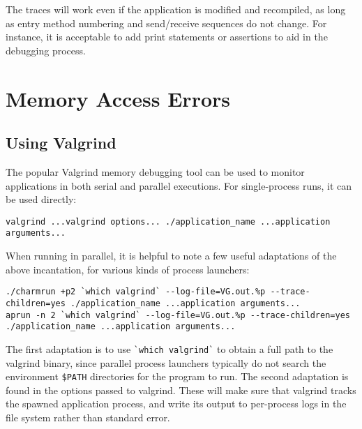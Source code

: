 The traces will work even if the application is modified and
recompiled, as long as entry method numbering and send/receive
sequences do not change. For instance, it is acceptable to add print
statements or assertions to aid in the debugging process.


\section{Memory Access Errors}


\subsection{Using Valgrind}

The popular Valgrind memory debugging tool can be used to
monitor \charm applications in both serial and parallel
executions. For single-process runs, it can be used directly:
\begin{verbatim}
valgrind ...valgrind options... ./application_name ...application arguments...
\end{verbatim}

When running in parallel, it is helpful to note a few useful
adaptations of the above incantation, for various kinds of process launchers:
\begin{verbatim}
./charmrun +p2 `which valgrind` --log-file=VG.out.%p --trace-children=yes ./application_name ...application arguments...
aprun -n 2 `which valgrind` --log-file=VG.out.%p --trace-children=yes ./application_name ...application arguments...
\end{verbatim}
The first adaptation is to use \verb+`which valgrind`+ to obtain a
full path to the valgrind binary, since parallel process launchers
typically do not search the environment \verb+$PATH+ directories for
the program to run. The second adaptation is found in the options
passed to valgrind. These will make sure that valgrind tracks the
spawned application process, and write its output to per-process logs
in the file system rather than standard error.
